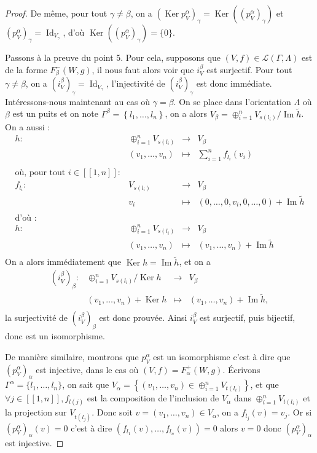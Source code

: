 \documentclass[a4paper,10pt]{article}
\DeclareMathOperator{\Ker}{Ker}
\DeclareMathOperator{\Id}{Id}
\DeclareMathOperator{\Img}{Im}
\begin{document}
\begin{proof}
        De même, pour tout $\gamma\neq\beta$, on a $(\Ker p_{V}^{\alpha})_{\gamma}=\Ker((p_{V}^{\alpha})_{\gamma})$ et $(p_{V}^{\alpha})_{\gamma}=\Id_{V_{\gamma}}$, d'où $\Ker((p_{V}^{\alpha})_{\gamma})=\{0\}$.

	Passons à la preuve du point 5. Pour cela, supposons que $(V,f)\in\mathscr{L}(\Gamma,\Lambda)$ est de la forme $F_{\beta}^{-}(W,g)$, il nous faut alors voir que $i_{V}^{\beta}$ est surjectif. Pour tout $\gamma\neq\beta$, on a $(i_{V}^{\beta})_{\gamma}=\Id_{V_{\gamma}}$, l'injectivité de $(i_{V}^{\beta})_{\gamma}$ est donc immédiate. Intéressons-nous maintenant au cas où $\gamma=\beta$. On se place dans l'orientation $\Lambda$ où $\beta$ est un puits et on note $\Gamma^{\beta}=\left\{ l_{1},\dots,l_{n} \right\}$, on a alors $V_{\beta}=\oplus_{i=1}^{n}V_{s(l_{i})}/\Img \widetilde{h}$. On a aussi :
	\[
\begin{array}{rccc}
	h: & \oplus_{i=1}^{n}V_{s(l_{i})} & \rightarrow & V_{\beta} \\
	& (v_{1},\dots,v_{n}) & \mapsto & \sum_{i=1}^{n}f_{l_{i}}(v_{i})\\
	&&&\\
	\text{où, pour tout }i\in[\![1,n]\!] : &&&\\
	f_{l_{i}}:& V_{s(l_{i})} & \rightarrow & V_{\beta} \\
	& v_{i} & \mapsto & (0,\dots,0,v_{i},0,\dots,0)+\Img \widetilde{h}\\
	&&&\\
	\text{d'où :} &&&\\
	h: & \oplus_{i=1}^{n}V_{s(l_{i})} & \rightarrow & V_{\beta} \\
	& (v_{1},\dots,v_{n}) & \mapsto & (v_{1},\dots,v_{n}) + \Img \widetilde{h}\\
\end{array}
	\]
	On a alors immédiatement que $\Ker h = \Img \widetilde{h}$, et on a
	\[
		\begin{array}{rccc}
			(i_{V}^{\beta})_{\beta} : & \oplus_{i=1}^{n}V_{s(l_{i})}/\Ker h & \rightarrow & V_{\beta}\\
			& (v_{1},\dots,v_{n})+\Ker h & \mapsto & (v_{1},\dots,v_{n})+\Img \widetilde{h},\\
		\end{array}
	\]
	la surjectivité de $(i_{V}^{\beta})_{\beta}$ est donc prouvée. Ainsi $i_{V}^{\beta}$ est surjectif, puis bijectif, donc est un isomorphisme.

        De manière similaire, montrons que $p_{V}^{\alpha}$ est un isomorphisme c'est à dire que $(p_{V}^{\alpha})_{\alpha}$ est injective, dans le cas où $(V,f) = F_{\alpha}^{+}(W,g)$. Écrivons $\Gamma^{\alpha} = \{l_{1}, \dots, l_{n}\}$, on sait que $V_{\alpha} = \left\{ (v_{1}, \dots, v_{n}) \in \oplus_{i=1}^{n}  V_{t(l_{i})}\right\}$, et que $\forall j \in [\![1,n]\!] , f_{l(j)}$ est la composition de l'inclusion de $V_{\alpha}$ dans $\oplus_{i=1}^{n}V_{t(l_{i})}$ et la projection sur $V_{t(l_{j})}$. Donc soit $v= (v_{1}, \dots, v_{n}) \in V_{\alpha}$, on a $ f_{l_{j}}(v) = v_{j}$. Or si $(p_{V}^{\alpha})_{\alpha}(v) = 0 $ c'est à dire $(f_{l_{1}}(v), \dots, f_{l_{n}}(v)) = 0 $ alors $v = 0$ donc $(p_{V}^{\alpha})_{\alpha}$ est injective.



\end{proof}
\end{document}
